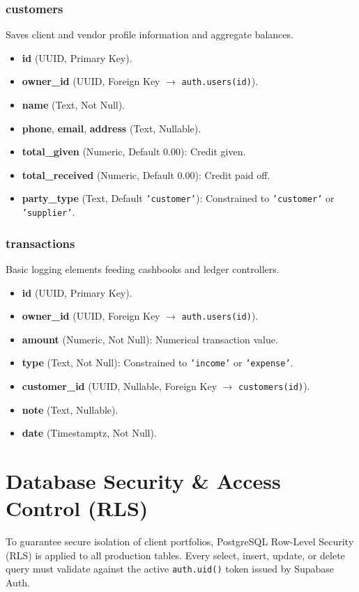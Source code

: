 \documentclass[journal, a4paper, onecolumn, 12pt]{IEEEtran}
\begin{document}
\subsubsection{\textbf{customers}}
Saves client and vendor profile information and aggregate balances.
\begin{itemize}[leftmargin=*]
    \item \textbf{id} (UUID, Primary Key).
    \item \textbf{owner\_id} (UUID, Foreign Key $\rightarrow$ \texttt{auth.users(id)}).
    \item \textbf{name} (Text, Not Null).
    \item \textbf{phone}, \textbf{email}, \textbf{address} (Text, Nullable).
    \item \textbf{total\_given} (Numeric, Default 0.00): Credit given.
    \item \textbf{total\_received} (Numeric, Default 0.00): Credit paid off.
    \item \textbf{party\_type} (Text, Default \texttt{'customer'}): Constrained to \texttt{'customer'} or \texttt{'supplier'}.
\end{itemize}

\subsubsection{\textbf{transactions}}
Basic logging elements feeding cashbooks and ledger controllers.
\begin{itemize}[leftmargin=*]
    \item \textbf{id} (UUID, Primary Key).
    \item \textbf{owner\_id} (UUID, Foreign Key $\rightarrow$ \texttt{auth.users(id)}).
    \item \textbf{amount} (Numeric, Not Null): Numerical transaction value.
    \item \textbf{type} (Text, Not Null): Constrained to \texttt{'income'} or \texttt{'expense'}.
    \item \textbf{customer\_id} (UUID, Nullable, Foreign Key $\rightarrow$ \texttt{customers(id)}).
    \item \textbf{note} (Text, Nullable).
    \item \textbf{date} (Timestamptz, Not Null).
\end{itemize}

\section{Database Security \& Access Control (RLS)}
To guarantee secure isolation of client portfolios, PostgreSQL Row-Level Security (RLS) is applied to all production tables. Every select, insert, update, or delete query must validate against the active \texttt{auth.uid()} token issued by Supabase Auth.
\end{document}
